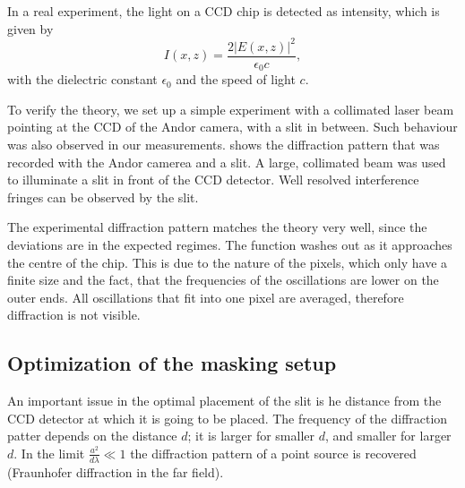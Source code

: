 In a real experiment, the light on a CCD chip is detected as intensity, which is given by
\begin{equation}
I(x,z) = \frac{2 \lvert E(x,z) \rvert ^2}{\epsilon_0 c} ,
\end{equation}
with the dielectric constant $\epsilon_0$ and the speed of light $c$.

To verify the theory, we set up a simple experiment with a collimated laser beam pointing at the CCD of the Andor camera, with a slit in between. Such behaviour was also observed in our measurements.  shows the diffraction pattern that was recorded with the Andor camerea and a slit. A large, collimated beam was used to illuminate a slit in front of the CCD detector. Well resolved interference fringes can be observed by the slit.


The experimental diffraction pattern matches the theory very well, since the deviations are in the expected regimes.
The function washes out as it approaches the centre of the chip. This is due to the nature of the pixels, which only have a finite size and the fact, that the frequencies of the oscillations are lower on the outer ends. All oscillations that fit into one pixel are averaged, therefore diffraction is not visible.

\newpage
\subsection{Optimization of the masking setup}
\label{subsec:slit_optim}

An important issue in the optimal placement of the slit is he distance from the CCD detector at which it is going to be placed. The frequency of the diffraction patter depends on the distance $d$; it is larger for smaller $d$, and smaller for larger $d$. In the limit $\frac{a^2}{d\lambda} \ll 1$ the diffraction pattern of a point source is recovered (Fraunhofer diffraction in the far field).

